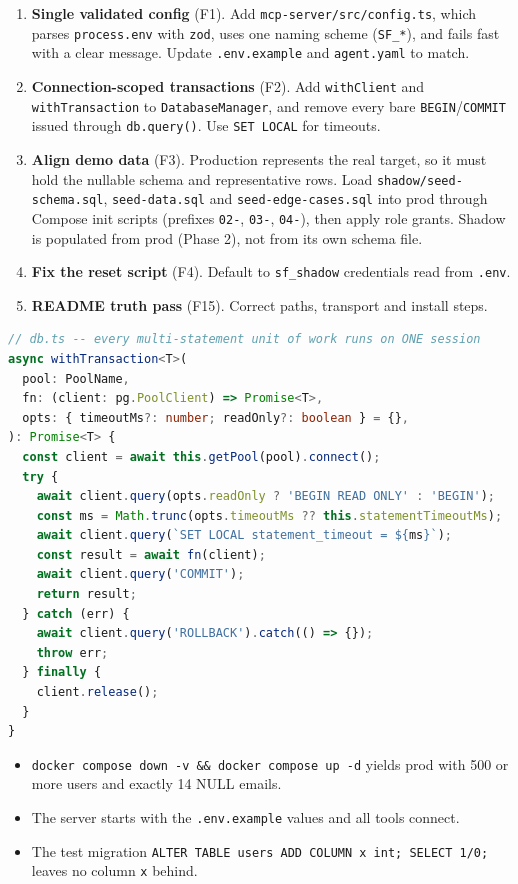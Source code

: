\documentclass[11pt,a4paper]{article}
\newcommand{\fp}[1]{\nolinkurl{#1}}  %
\begin{document}
\begin{enumerate}[leftmargin=*,label=\textbf{0.\arabic*}]
  \item \textbf{Single validated config} (F1). Add \fp{mcp-server/src/config.ts}, which parses
        \fp{process.env} with \fp{zod}, uses one naming scheme (\fp{SF_*}), and fails fast
        with a clear message. Update \fp{.env.example} and \fp{agent.yaml} to match.
  \item \textbf{Connection-scoped transactions} (F2). Add \fp{withClient} and
        \fp{withTransaction} to \fp{DatabaseManager}, and remove every bare
        \texttt{BEGIN}/\texttt{COMMIT} issued through \fp{db.query()}. Use \texttt{SET LOCAL} for timeouts.
  \item \textbf{Align demo data} (F3). Production represents the real target, so it
        must hold the nullable schema and representative rows. Load \fp{shadow/seed-schema.sql},
        \fp{seed-data.sql} and \fp{seed-edge-cases.sql} into prod through Compose init scripts
        (prefixes \fp{02-}, \fp{03-}, \fp{04-}), then apply role grants. Shadow is populated
        from prod (Phase 2), not from its own schema file.
  \item \textbf{Fix the reset script} (F4). Default to \fp{sf_shadow} credentials read from \fp{.env}.
  \item \textbf{README truth pass} (F15). Correct paths, transport and install steps.
\end{enumerate}

\begin{lstlisting}[language=TypeScript]
// db.ts -- every multi-statement unit of work runs on ONE session
async withTransaction<T>(
  pool: PoolName,
  fn: (client: pg.PoolClient) => Promise<T>,
  opts: { timeoutMs?: number; readOnly?: boolean } = {},
): Promise<T> {
  const client = await this.getPool(pool).connect();
  try {
    await client.query(opts.readOnly ? 'BEGIN READ ONLY' : 'BEGIN');
    const ms = Math.trunc(opts.timeoutMs ?? this.statementTimeoutMs);
    await client.query(`SET LOCAL statement_timeout = ${ms}`);
    const result = await fn(client);
    await client.query('COMMIT');
    return result;
  } catch (err) {
    await client.query('ROLLBACK').catch(() => {});
    throw err;
  } finally {
    client.release();
  }
}
\end{lstlisting}

\begin{acceptbox}
\begin{itemize}[leftmargin=*]
  \item \texttt{docker compose down -v \&\& docker compose up -d} yields prod with 500 or more users
        and exactly 14 NULL emails.
  \item The server starts with the \fp{.env.example} values and all tools connect.
  \item The test migration \texttt{ALTER TABLE users ADD COLUMN x int; SELECT 1/0;} leaves no
        column \texttt{x} behind.
\end{itemize}
\end{acceptbox}
\end{document}
